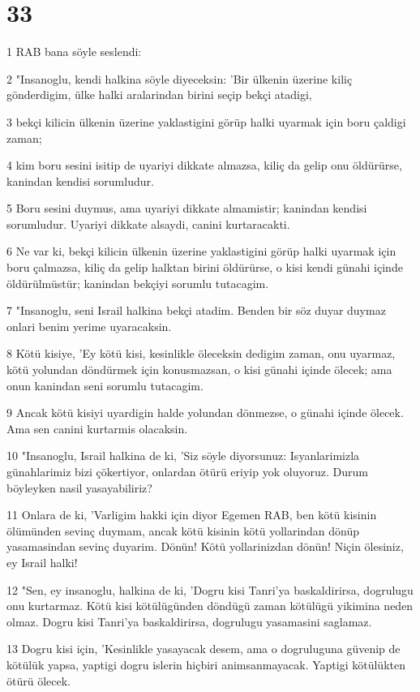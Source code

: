 \chapter{33}

\par 1 RAB bana söyle seslendi:
\par 2 "Insanoglu, kendi halkina söyle diyeceksin: 'Bir ülkenin üzerine kiliç gönderdigim, ülke halki aralarindan birini seçip bekçi atadigi,
\par 3 bekçi kilicin ülkenin üzerine yaklastigini görüp halki uyarmak için boru çaldigi zaman;
\par 4 kim boru sesini isitip de uyariyi dikkate almazsa, kiliç da gelip onu öldürürse, kanindan kendisi sorumludur.
\par 5 Boru sesini duymus, ama uyariyi dikkate almamistir; kanindan kendisi sorumludur. Uyariyi dikkate alsaydi, canini kurtaracakti.
\par 6 Ne var ki, bekçi kilicin ülkenin üzerine yaklastigini görüp halki uyarmak için boru çalmazsa, kiliç da gelip halktan birini öldürürse, o kisi kendi günahi içinde öldürülmüstür; kanindan bekçiyi sorumlu tutacagim.
\par 7 "Insanoglu, seni Israil halkina bekçi atadim. Benden bir söz duyar duymaz onlari benim yerime uyaracaksin.
\par 8 Kötü kisiye, 'Ey kötü kisi, kesinlikle öleceksin dedigim zaman, onu uyarmaz, kötü yolundan döndürmek için konusmazsan, o kisi günahi içinde ölecek; ama onun kanindan seni sorumlu tutacagim.
\par 9 Ancak kötü kisiyi uyardigin halde yolundan dönmezse, o günahi içinde ölecek. Ama sen canini kurtarmis olacaksin.
\par 10 "Insanoglu, Israil halkina de ki, 'Siz söyle diyorsunuz: Isyanlarimizla günahlarimiz bizi çökertiyor, onlardan ötürü eriyip yok oluyoruz. Durum böyleyken nasil yasayabiliriz?
\par 11 Onlara de ki, 'Varligim hakki için diyor Egemen RAB, ben kötü kisinin ölümünden sevinç duymam, ancak kötü kisinin kötü yollarindan dönüp yasamasindan sevinç duyarim. Dönün! Kötü yollarinizdan dönün! Niçin ölesiniz, ey Israil halki!
\par 12 "Sen, ey insanoglu, halkina de ki, 'Dogru kisi Tanri'ya baskaldirirsa, dogrulugu onu kurtarmaz. Kötü kisi kötülügünden döndügü zaman kötülügü yikimina neden olmaz. Dogru kisi Tanri'ya baskaldirirsa, dogrulugu yasamasini saglamaz.
\par 13 Dogru kisi için, 'Kesinlikle yasayacak desem, ama o dogruluguna güvenip de kötülük yapsa, yaptigi dogru islerin hiçbiri animsanmayacak. Yaptigi kötülükten ötürü ölecek.
